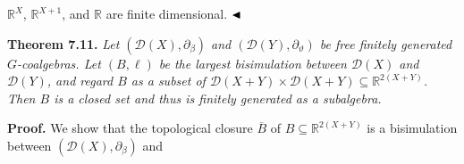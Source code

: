 \hypertarget{html:S7.SS0.SSS0.P0.SPx6.p1.m1}{}\({\mathbb{R}^{X}}\), %
\hypertarget{html:S7.SS0.SSS0.P0.SPx6.p1.m2}{}\({\mathbb{R}^{X+1}}\), and %
\hypertarget{html:S7.SS0.SSS0.P0.SPx6.p1.m3}{}\({\mathbb{R}}\) are finite dimensional. %
\hypertarget{html:S7.SS0.SSS0.P0.SPx6.p1.m4}{}\({\hfill\blacktriangleleft}\)
\par\medskip
\hypertarget{html:S7.Thmtheorem11}{} \par\noindent\textbf{\textbf{Theorem 7.11}\textbf{.}}\quad  %
\hypertarget{html:S7.Thmtheorem11.p1}{} \emph{Let %
\hypertarget{html:S7.Thmtheorem11.p1.m1}{}\({({\mathcal{D}}(X),\partial_{\beta})}\) and %
\hypertarget{html:S7.Thmtheorem11.p1.m2}{}\({({\mathcal{D}}(Y),\partial_{\vartheta})}\) be free finitely generated %
\hypertarget{html:S7.Thmtheorem11.p1.m3}{}\({G}\)-coalgebras. Let %
\hypertarget{html:S7.Thmtheorem11.p1.m4}{}\({(B,\ell)}\) be the largest bisimulation between %
\hypertarget{html:S7.Thmtheorem11.p1.m5}{}\({{\mathcal{D}}(X)}\) and %
\hypertarget{html:S7.Thmtheorem11.p1.m6}{}\({{\mathcal{D}}(Y)}\), and regard %
\hypertarget{html:S7.Thmtheorem11.p1.m7}{}\({B}\) as a subset of %
\hypertarget{html:S7.Thmtheorem11.p1.m8}{}\({{\mathcal{D}}(X+Y)\times{\mathcal{D}}(X+Y)\subseteq\mathbb{R}^{2(X+Y)}}\). Then %
\hypertarget{html:S7.Thmtheorem11.p1.m9}{}\({B}\) is a closed set and thus is finitely generated as a subalgebra.}
\par\medskip
\hypertarget{html:S7.SS0.SSS0.P0.SPx7}{} \par\noindent\textbf{Proof.}\quad  %
\hypertarget{html:S7.SS0.SSS0.P0.SPx7.p1}{} We show that the topological closure %
\hypertarget{html:S7.SS0.SSS0.P0.SPx7.p1.m1}{}\({\overline{B}}\) of %
\hypertarget{html:S7.SS0.SSS0.P0.SPx7.p1.m2}{}\({B\subseteq\mathbb{R}^{2(X+Y)}}\) is a bisimulation between %
\hypertarget{html:S7.SS0.SSS0.P0.SPx7.p1.m3}{}\({({\mathcal{D}}(X),\partial_{\beta})}\) and %
